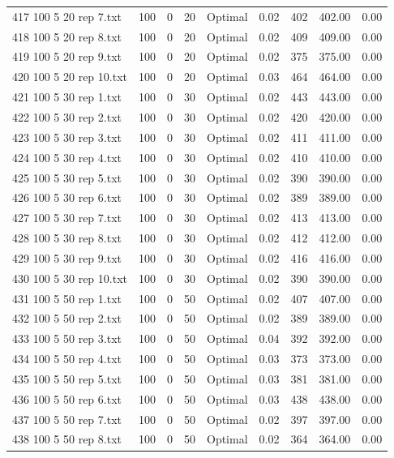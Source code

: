 \begin{longtable}{lrrllrrrr}
417 100 5 20 rep 7.txt & 100 & 0 & 20 & Optimal &  0.02 & 402 & 402.00 &  0.00\\
418 100 5 20 rep 8.txt & 100 & 0 & 20 & Optimal &  0.02 & 409 & 409.00 &  0.00\\
419 100 5 20 rep 9.txt & 100 & 0 & 20 & Optimal &  0.02 & 375 & 375.00 &  0.00\\
420 100 5 20 rep 10.txt & 100 & 0 & 20 & Optimal &  0.03 & 464 & 464.00 &  0.00\\
421 100 5 30 rep 1.txt & 100 & 0 & 30 & Optimal &  0.02 & 443 & 443.00 &  0.00\\
422 100 5 30 rep 2.txt & 100 & 0 & 30 & Optimal &  0.02 & 420 & 420.00 &  0.00\\
423 100 5 30 rep 3.txt & 100 & 0 & 30 & Optimal &  0.02 & 411 & 411.00 &  0.00\\
424 100 5 30 rep 4.txt & 100 & 0 & 30 & Optimal &  0.02 & 410 & 410.00 &  0.00\\
425 100 5 30 rep 5.txt & 100 & 0 & 30 & Optimal &  0.02 & 390 & 390.00 &  0.00\\
426 100 5 30 rep 6.txt & 100 & 0 & 30 & Optimal &  0.02 & 389 & 389.00 &  0.00\\
427 100 5 30 rep 7.txt & 100 & 0 & 30 & Optimal &  0.02 & 413 & 413.00 &  0.00\\
428 100 5 30 rep 8.txt & 100 & 0 & 30 & Optimal &  0.02 & 412 & 412.00 &  0.00\\
429 100 5 30 rep 9.txt & 100 & 0 & 30 & Optimal &  0.02 & 416 & 416.00 &  0.00\\
430 100 5 30 rep 10.txt & 100 & 0 & 30 & Optimal &  0.02 & 390 & 390.00 &  0.00\\
431 100 5 50 rep 1.txt & 100 & 0 & 50 & Optimal &  0.02 & 407 & 407.00 &  0.00\\
432 100 5 50 rep 2.txt & 100 & 0 & 50 & Optimal &  0.02 & 389 & 389.00 &  0.00\\
433 100 5 50 rep 3.txt & 100 & 0 & 50 & Optimal &  0.04 & 392 & 392.00 &  0.00\\
434 100 5 50 rep 4.txt & 100 & 0 & 50 & Optimal &  0.03 & 373 & 373.00 &  0.00\\
435 100 5 50 rep 5.txt & 100 & 0 & 50 & Optimal &  0.03 & 381 & 381.00 &  0.00\\
436 100 5 50 rep 6.txt & 100 & 0 & 50 & Optimal &  0.03 & 438 & 438.00 &  0.00\\
437 100 5 50 rep 7.txt & 100 & 0 & 50 & Optimal &  0.02 & 397 & 397.00 &  0.00\\
438 100 5 50 rep 8.txt & 100 & 0 & 50 & Optimal &  0.02 & 364 & 364.00 &  0.00\\

\end{longtable}
